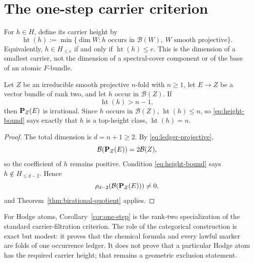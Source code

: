 \section{The one-step carrier criterion}
\label{sec:one-step}

For $h\in H$, define its carrier height by
\[
 \operatorname{ht}(h):=
 \min\{\dim W:h\text{ occurs in }\mathcal B(W),\ W
             \text{ smooth projective}\}.
 \tag{4.1}\label{eq:height}
\]
Equivalently, $h\in H_{\le e}$ if and only if
\(\operatorname{ht}(h)\le e\).  This is the dimension of a smallest carrier,
not the dimension of a spectral-cover component or of the base of an atomic
$F$-bundle.

\begin{corollary}
\label{cor:one-step}
Let $Z$ be an irreducible smooth projective $n$-fold with $n\ge1$, let
$E\to Z$ be a vector bundle of rank two, and let $h$ occur in
\(\mathcal B(Z)\).  If
\[
 \operatorname{ht}(h)>n-1,
 \tag{4.2}\label{eq:height-bound}
\]
then \(\mathbf P_Z(E)\) is irrational.  Since $h$ occurs in \(\mathcal B(Z)\),
\(\operatorname{ht}(h)\le n\), so \eqref{eq:height-bound} says exactly that
$h$ is a top-height class, \(\operatorname{ht}(h)=n\).
\end{corollary}

\begin{proof}
The total dimension is $d=n+1\ge2$.  By
\eqref{eq:ledger-projective},
\[
 \mathcal B(\mathbf P_Z(E))=2\mathcal B(Z),
\]
so the coefficient of $h$ remains positive.  Condition
\eqref{eq:height-bound} says $h\notin H_{\le d-2}$.  Hence
\[
 \rho_{d-2}(\mathcal B(\mathbf P_Z(E)))\ne0,
\]
and Theorem~\ref{thm:birational-quotient} applies.
\end{proof}

For Hodge atoms, Corollary~\ref{cor:one-step} is the rank-two specialization
of the standard carrier-filtration criterion.  The role of the categorical
construction is exact but modest: it proves that the chemical formula and
every lawful marker are folds of one occurrence ledger.  It does not prove
that a particular Hodge atom has the required carrier height; that remains a
geometric exclusion statement.

